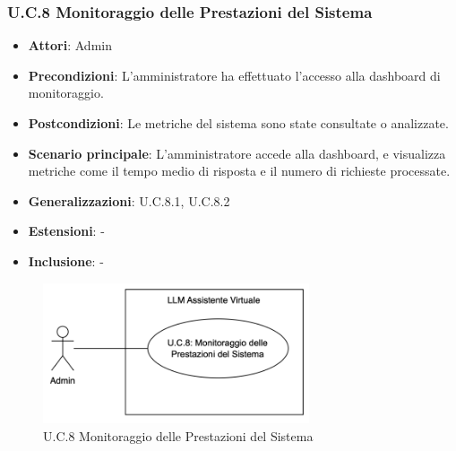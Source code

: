 \subsubsection{U.C.8 Monitoraggio delle Prestazioni del Sistema}
\begin{itemize}
    \item \textbf{Attori}: Admin
    \item \textbf{Precondizioni}: L’amministratore ha effettuato l’accesso alla dashboard di monitoraggio.
    \item \textbf{Postcondizioni}: Le metriche del sistema sono state consultate o analizzate.
    \item \textbf{Scenario principale}: L'amministratore accede alla dashboard, e visualizza metriche come il tempo medio di risposta e il numero di richieste processate.
    \item \textbf{Generalizzazioni}: U.C.8.1, U.C.8.2
    \item \textbf{Estensioni}: -
    \item \textbf{Inclusione}: -
\end{itemize}
\begin{figure}[H]
    \centering
    \includegraphics[width=0.7\textwidth]{img/UC8.png}
    \caption{U.C.8 Monitoraggio delle Prestazioni del Sistema}
\end{figure}
\newpage

